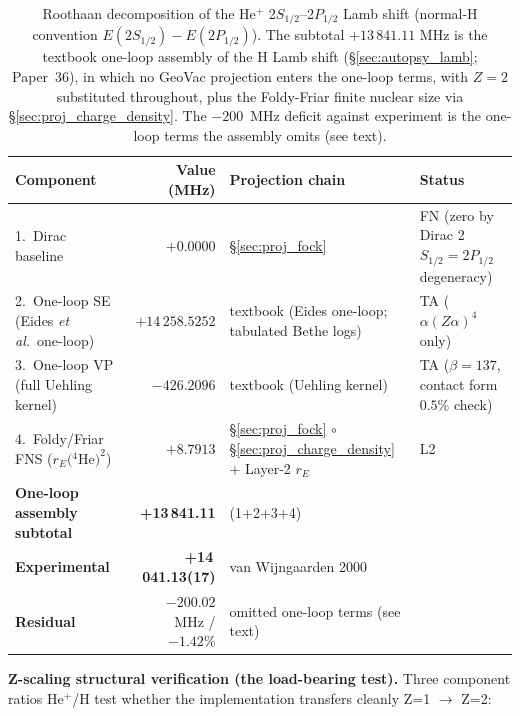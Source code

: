\documentclass[11pt]{article}
\begin{document}
\begin{table}[h!]
\centering\small
\caption{Roothaan decomposition of the He$^+$
2$S_{1/2}$--2$P_{1/2}$ Lamb shift (normal-H convention
$E(2S_{1/2}) - E(2P_{1/2})$).  The subtotal $+13\,841.11$ MHz is the
textbook one-loop assembly of the H Lamb shift (\S\ref{sec:autopsy_lamb};
Paper~36), in which no GeoVac projection enters the one-loop terms, with
$Z = 2$ substituted throughout, plus the Foldy-Friar finite nuclear size
via \S\ref{sec:proj_charge_density}.  The $-200$~MHz deficit against
experiment is the one-loop terms the assembly omits (see text).}
\label{tab:autopsy_he_plus_lamb}
\begin{tabular}{p{5.5cm} r p{4.7cm} l}
\toprule
Component & Value (MHz) & Projection chain & Status \\
\midrule
1.~Dirac baseline & $+0.0000$ &
\S\ref{sec:proj_fock} & FN (zero by Dirac 2$S_{1/2}=2P_{1/2}$ degeneracy) \\
2.~One-loop SE (Eides \emph{et al.}\ one-loop) & $+14\,258.5252$ &
textbook (Eides one-loop; tabulated Bethe logs)
& TA ($\alpha(Z\alpha)^4$ only) \\
3.~One-loop VP (full Uehling kernel) & $-426.2096$ &
textbook (Uehling kernel)
& TA ($\beta = 137$, contact form $0.5\%$ check) \\
4.~Foldy/Friar FNS ($r_E({}^4$He$)^2$) & $+8.7913$ &
\S\ref{sec:proj_fock} $\circ$ \S\ref{sec:proj_charge_density} $+$
Layer-2 $r_E$ & L2 \\
\midrule
\textbf{One-loop assembly subtotal} & \textbf{+13\,841.11} & (1+2+3+4) & \\
\textbf{Experimental} & \textbf{+14\,041.13(17)} & van Wijngaarden 2000 & \\
\textbf{Residual} & $\mathbf{-200.02}$ MHz / $-1.42\%$
& omitted one-loop terms (see text) & \\
\bottomrule
\end{tabular}
\end{table}

\textbf{Z-scaling structural verification (the load-bearing test).}
Three component ratios He$^+$/H test whether the implementation
transfers cleanly Z=1 $\to$ Z=2:
\end{document}
